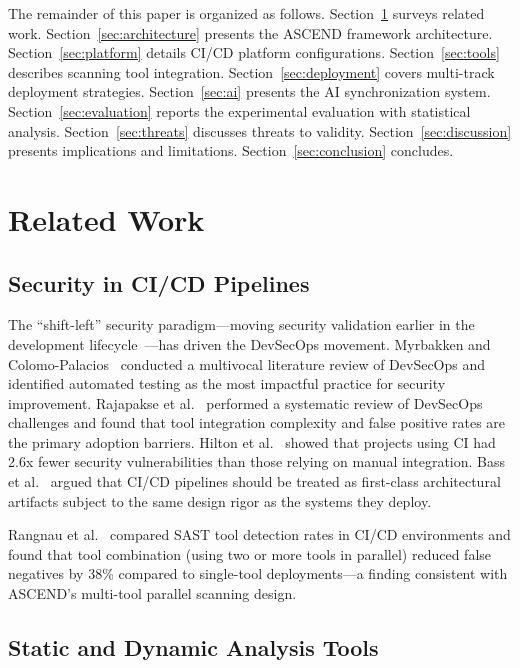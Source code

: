 \documentclass[journal]{IEEEtran}
\begin{document}
The remainder of this paper is organized as follows. Section~\ref{sec:related} surveys related work. Section~\ref{sec:architecture} presents the ASCEND framework architecture. Section~\ref{sec:platform} details CI/CD platform configurations. Section~\ref{sec:tools} describes scanning tool integration. Section~\ref{sec:deployment} covers multi-track deployment strategies. Section~\ref{sec:ai} presents the AI synchronization system. Section~\ref{sec:evaluation} reports the experimental evaluation with statistical analysis. Section~\ref{sec:threats} discusses threats to validity. Section~\ref{sec:discussion} presents implications and limitations. Section~\ref{sec:conclusion} concludes.

\section{Related Work}
\label{sec:related}

\subsection{Security in CI/CD Pipelines}

The ``shift-left'' security paradigm---moving security validation earlier in the development lifecycle~\cite{smith2001}---has driven the DevSecOps movement. Myrbakken and Colomo-Palacios~\cite{myrbakken2017} conducted a multivocal literature review of DevSecOps and identified automated testing as the most impactful practice for security improvement. Rajapakse et al.~\cite{rajapakse2022} performed a systematic review of DevSecOps challenges and found that tool integration complexity and false positive rates are the primary adoption barriers. Hilton et al.~\cite{hilton2016} showed that projects using CI had 2.6x fewer security vulnerabilities than those relying on manual integration. Bass et al.~\cite{bass2015} argued that CI/CD pipelines should be treated as first-class architectural artifacts subject to the same design rigor as the systems they deploy.

Rangnau et al.~\cite{rangnau2020} compared SAST tool detection rates in CI/CD environments and found that tool combination (using two or more tools in parallel) reduced false negatives by 38\% compared to single-tool deployments---a finding consistent with ASCEND's multi-tool parallel scanning design.

\subsection{Static and Dynamic Analysis Tools}
\end{document}
